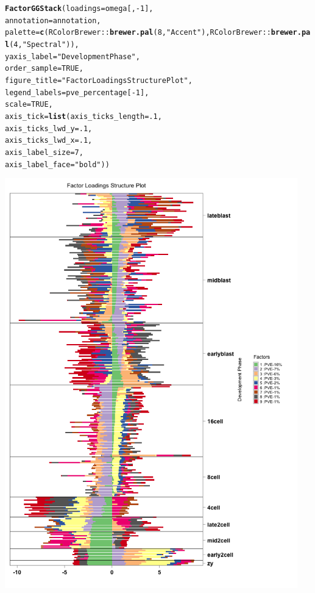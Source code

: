 \documentclass[12pt]{article}\usepackage[]{graphicx}\usepackage[usenames,dvipsnames]{color}
\makeatletter
\newcommand{\hlnum}[1]{\textcolor[rgb]{0.686,0.059,0.569}{#1}}%
\newcommand{\hlstr}[1]{\textcolor[rgb]{0.192,0.494,0.8}{#1}}%
\newcommand{\hlopt}[1]{\textcolor[rgb]{0,0,0}{#1}}%
\newcommand{\hlstd}[1]{\textcolor[rgb]{0.345,0.345,0.345}{#1}}%
\newcommand{\hlkwc}[1]{\textcolor[rgb]{0.333,0.667,0.333}{#1}}%
\newcommand{\hlkwd}[1]{\textcolor[rgb]{0.737,0.353,0.396}{\textbf{#1}}}%
\newenvironment{kframe}{%
 \def\at@end@of@kframe{}%
 \ifinner\ifhmode%
  \def\at@end@of@kframe{\end{minipage}}%
  \begin{minipage}{\columnwidth}%
 \fi\fi%
 \def\FrameCommand##1{\hskip\@totalleftmargin \hskip-\fboxsep
 \colorbox{shadecolor}{##1}\hskip-\fboxsep
     \hskip-\linewidth \hskip-\@totalleftmargin \hskip\columnwidth}%
 \MakeFramed {\advance\hsize-\width
   \@totalleftmargin\z@ \linewidth\hsize
   \@setminipage}}%
 {\par\unskip\endMakeFramed%
 \at@end@of@kframe}
\newenvironment{knitrout}{}{} %
\makeatother
\begin{document}
\begin{knitrout}
\begin{kframe}
\begin{alltt}
\hlkwd{FactorGGStack}\hlstd{(}\hlkwc{loadings} \hlstd{= omega[,}\hlopt{-}\hlnum{1}\hlstd{],}
                \hlkwc{annotation} \hlstd{= annotation,}
                \hlkwc{palette} \hlstd{=} \hlkwd{c}\hlstd{(RColorBrewer}\hlopt{::}\hlkwd{brewer.pal}\hlstd{(}\hlnum{8}\hlstd{,} \hlstr{"Accent"}\hlstd{),RColorBrewer}\hlopt{::}\hlkwd{brewer.pal}\hlstd{(}\hlnum{4}\hlstd{,} \hlstr{"Spectral"}\hlstd{)),}
                \hlkwc{yaxis_label} \hlstd{=} \hlstr{"Development Phase"}\hlstd{,}
                \hlkwc{order_sample} \hlstd{=} \hlnum{TRUE}\hlstd{,}
                \hlkwc{figure_title} \hlstd{=} \hlstr{"Factor Loadings Structure Plot"}\hlstd{,}
                \hlkwc{legend_labels} \hlstd{= pve_percentage[}\hlopt{-}\hlnum{1}\hlstd{],}
                \hlkwc{scale}\hlstd{=}\hlnum{TRUE}\hlstd{,}
                \hlkwc{axis_tick} \hlstd{=} \hlkwd{list}\hlstd{(}\hlkwc{axis_ticks_length} \hlstd{=} \hlnum{.1}\hlstd{,}
                                 \hlkwc{axis_ticks_lwd_y} \hlstd{=} \hlnum{.1}\hlstd{,}
                                 \hlkwc{axis_ticks_lwd_x} \hlstd{=} \hlnum{.1}\hlstd{,}
                                 \hlkwc{axis_label_size} \hlstd{=} \hlnum{7}\hlstd{,}
                                 \hlkwc{axis_label_face} \hlstd{=} \hlstr{"bold"}\hlstd{))}
\end{alltt}
\end{kframe}
\includegraphics[width=5in,height=7in]{figure/flash_structure-1}

\end{knitrout}
\end{document}

